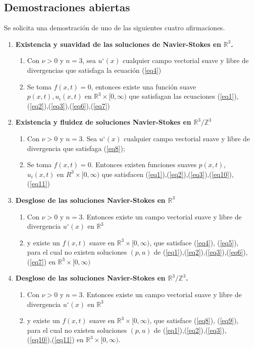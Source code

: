 \subsection{Demostraciones abiertas}
Se solicita una demostración de uno de las siguientes cuatro afirmaciones.
\begin{enumerate}
    \item \textbf{Existencia y suavidad de las soluciones de Navier-Stokes en $\mathbb{R}^3$.}
    \begin{enumerate}
        \item Con $\nu>0$ y $n=3$, sea $u^{\circ}(x)$ cualquier campo vectorial suave y libre de divergencias que satisfaga la ecuación (\ref{eq4})
        \item Se toma $f(x,t)=0$, entonces existe una función suave $p(x,t),u_i(x,t)$ en $\mathbb{R}^3\times [0,\infty)$ que satisfagan las ecuaciones (\ref{eq1}),(\ref{eq2}),(\ref{eq3}),(\ref{eq6}),(\ref{eq7})
    \end{enumerate}
    \item \textbf{Existencia y fluidez de soluciones Navier-Stokes en $\mathbb{R}^3/\mathbb{Z}^3$} \begin{enumerate}
        \item Con $\nu > 0$ y $n = 3$. Sea $u^{\circ}(x)$ cualquier campo vectorial suave y libre de divergencia que satisfaga (\ref{eq8});
        \item Se toma $f(x, t)=0$. Entonces existen funciones suaves $p(x, t)$, $u_i(x, t)$ en $R^3\times [0,\infty)$ que satisfacen (\ref{eq1}),(\ref{eq2}),(\ref{eq3}),(\ref{eq10}),(\ref{eq11})
    \end{enumerate}
    \item \textbf{Desglose de las soluciones Navier-Stokes en $\mathbb{R}^3$} \begin{enumerate}
        \item  Con $\nu > 0$ y $n = 3$. Entonces existe un campo vectorial suave y libre de divergencia $u^{\circ}(x)$ en $\mathbb{R}^3$
        \item y existe un $f(x, t)$ suave en $\mathbb{R}^3 \times [0,\infty)$, que satisface (\ref{eq4}), (\ref{eq5}), para el cual no existen soluciones $(p, u)$ de (\ref{eq1}),(\ref{eq2}),(\ref{eq3}),(\ref{eq6}),(\ref{eq7}) en $\mathbb{R}^3\times [0,\infty)$
    \end{enumerate}
    \item \textbf{Desglose de las soluciones Navier-Stokes en $\mathbb{R}^3/\mathbb{Z}^3$.} \begin{enumerate}
        \item Con $\nu > 0$ y $n = 3$. Entonces existe un campo vectorial suave y libre de divergencia $u^{\circ}(x)$ en $\mathbb{R}^3$
        \item y existe un $f(x, t)$ suave en $\mathbb{R}^3 \times [0,\infty)$, que satisface (\ref{eq8}), (\ref{eq9}), para el cual no existen soluciones $(p, u)$ de (\ref{eq1}),(\ref{eq2}),(\ref{eq3}),(\ref{eq10}),(\ref{eq11}) en $\mathbb{R}^3 \times [0,\infty)$.
    \end{enumerate}
\end{enumerate}
